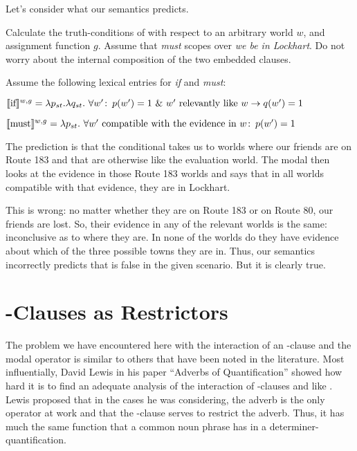 Let's consider what our semantics predicts.

\begin{exercise}
Calculate the truth-conditions of \Last with respect to an arbitrary world $w$,
and assignment function $g$. Assume that \emph{must} scopes over \emph{we be in Lockhart}. Do not worry about the internal composition of the two embedded clauses.

Assume the following lexical entries for \emph{if} and \emph{must}:

$\llbracket \text{if} \rrbracket^{w,g} = \lambda p_{st}.\lambda q_{st}.\ \forall w'\colon\thinspace p(w') = 1\ \&\ w'
\text{ relevantly like } w \rightarrow q(w') = 1$

$\llbracket \text{must} \rrbracket^{w,g} = \lambda p_{st}.\ \forall w' \text{ compatible with the evidence
  in } w\colon\thinspace p(w') = 1$ \eex
\end{exercise}
%
The prediction is that the conditional takes us to worlds where our friends are on Route 183 and that are otherwise like the evaluation world. The modal then looks at the evidence in those Route 183 worlds and says that in all worlds compatible with that evidence, they are in Lockhart. 

This is wrong: no matter whether they are on Route 183 or on Route 80, our friends are lost. So, their evidence in any of the relevant worlds is the same: inconclusive as to where they are. In none of the worlds do they have evidence about which of the three possible towns they are in. Thus, our semantics incorrectly predicts that \Last is false in the given scenario. But it is clearly true.

\section{-Clauses as Restrictors}

The problem we have encountered here with the interaction of an -clause and the modal operator  is similar to others that have been noted in the literature. Most influentially, David Lewis in his paper ``Adverbs of Quantification'' showed how hard it is to find an adequate analysis of the interaction of -clauses and  like . Lewis proposed that in the cases he was considering, the adverb is the only operator at work and that the -clause serves to restrict the adverb. Thus, it has much the same function that a common noun phrase has in a determiner-quantification. %

